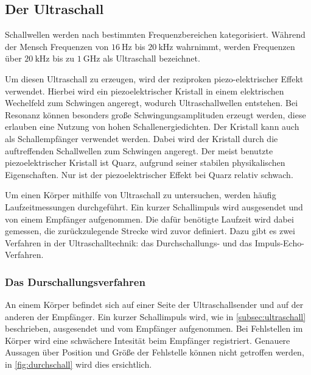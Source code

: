 \subsection{Der Ultraschall}
\label{subsec:ultraschall}

Schallwellen werden nach bestimmten Frequenzbereichen kategorisiert.
Während der Mensch Frequenzen von $\SI{16}{\hertz}$ bis $\SI{20}{\kilo\hertz}$ wahrnimmt, 
werden Frequenzen über $\SI{20}{\kilo\hertz}$ bis zu $\SI{1}{\giga\hertz}$ als Ultraschall bezeichnet.

\noindent
Um diesen Ultraschall zu erzeugen, wird der reziproken piezo-elektrischer Effekt verwendet.
Hierbei wird ein piezoelektrischer Kristall in einem elektrischen Wechelfeld zum Schwingen angeregt, wodurch Ultraschallwellen entstehen.
Bei Resonanz können besonders große Schwingungsamplituden erzeugt werden, diese erlauben eine Nutzung von hohen Schallenergiedichten.
Der Kristall kann auch als Schallempfänger verwendet werden. Dabei wird der Kristall durch die auftreffenden Schallwellen zum Schwingen angeregt.
Der meist benutzte piezoelektrischer Kristall ist Quarz, aufgrund seiner stabilen physikalischen Eigenschaften.
Nur ist der piezoelektrischer Effekt bei Quarz relativ schwach.

\noindent
Um einen Körper mithilfe von Ultraschall zu untersuchen, werden häufig Laufzeitmessungen durchgeführt.
Ein kurzer Schallimpuls wird ausgesendet und von einem Empfänger aufgenommen.
Die dafür benötigte Laufzeit wird dabei gemessen,  die zurückzulegende Strecke wird zuvor definiert.
Dazu gibt es zwei Verfahren in der Ultraschalltechnik: das Durchschallungs- und das Impuls-Echo-Verfahren.

\subsubsection{Das Durschallungsverfahren}
\label{subsubsec:durchschall}
An einem Körper befindet sich auf einer Seite der Ultraschallsender und auf der anderen der Empfänger.
Ein kurzer Schallimpuls wird, wie in \autoref{subsec:ultraschall} beschrieben, ausgesendet und vom Empfänger aufgenommen.
Bei Fehlstellen im Körper wird eine schwächere Intesität beim Empfänger registriert.
Genauere Aussagen über Position und Größe der Fehlstelle können nicht getroffen werden, in \autoref{fig:durchschall} wird dies ersichtlich.


